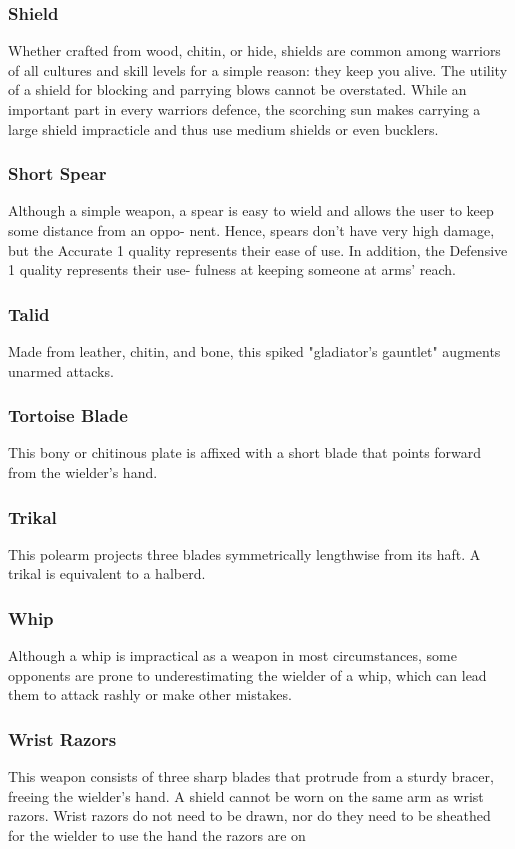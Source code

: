 \begin{multicols}{2}
\subsubsection{Shield}
\label{itmmlee:shield}
Whether crafted from wood, chitin, or hide, shields are
common among warriors of all cultures and skill levels for
a simple reason: they keep you alive. The utility of a shield
for blocking and parrying blows cannot be overstated. While
an important part in every warriors defence, the scorching sun
makes carrying a large shield impracticle and thus use medium
shields or even bucklers.

\subsubsection{Short Spear}
\label{itmmlee:shortspear}
Although a simple weapon, a spear is easy to wield and
allows the user to keep some distance from an oppo-
nent. Hence, spears don’t have very high damage, but
the Accurate 1 quality represents their ease of use. In
addition, the Defensive 1 quality represents their use-
fulness at keeping someone at arms’ reach.

\subsubsection{Talid}
\label{itmmlee:talid}
Made from leather, chitin, and bone, this spiked
"gladiator's gauntlet" augments unarmed attacks.

\subsubsection{Tortoise Blade}
\label{itmmlee:tortoiseblade}
This bony or chitinous plate is affixed with a short
blade that points forward from the wielder's hand.

\subsubsection{Trikal}
\label{itmmlee:trikal}
This polearm projects three blades symmetrically lengthwise
from its haft. A trikal is equivalent to a halberd.

\subsubsection{Whip}
\label{itmmlee:whip}
Although a whip is impractical as a weapon
in most circumstances, some opponents are prone
to underestimating the wielder of a whip, which can
lead them to attack rashly or make other mistakes.

\subsubsection{Wrist Razors}
\label{itmmlee:wristrazors}
This weapon consists of three sharp blades that protrude from
a sturdy bracer, freeing the wielder's hand. A shield cannot
be worn on the same arm as wrist razors. Wrist razors do not
need to be drawn, nor do they need to be sheathed for the
wielder to use the hand the razors are on

\end{multicols}
